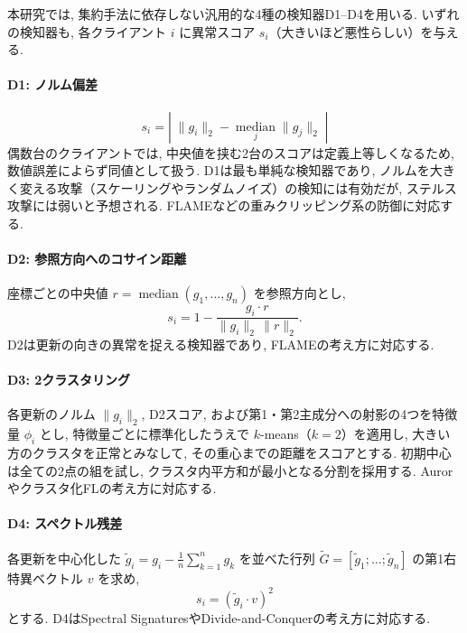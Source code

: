 \documentclass[a4j, twocolumn, dvipdfmx]{jsarticle}
\begin{document}
本研究では, 集約手法に依存しない汎用的な4種の検知器D1--D4を用いる. いずれの検知器も, 各クライアント $i$ に異常スコア $s_i$（大きいほど悪性らしい）を与える.

\paragraph{D1: ノルム偏差}
\begin{equation}
s_i = \left|\; \|g_i\|_2 - \operatorname*{median}_{j}\|g_j\|_2 \;\right|
\end{equation}
偶数台のクライアントでは, 中央値を挟む2台のスコアは定義上等しくなるため, 数値誤差によらず同値として扱う. D1は最も単純な検知器であり, ノルムを大きく変える攻撃（スケーリングやランダムノイズ）の検知には有効だが, ステルス攻撃には弱いと予想される. FLAME\cite{nguyen2022flame}などの重みクリッピング系の防御に対応する.

\paragraph{D2: 参照方向へのコサイン距離}
座標ごとの中央値 $r = \operatorname{median}(g_1,\dots,g_n)$ を参照方向とし,
\begin{equation}
s_i = 1 - \frac{g_i \cdot r}{\|g_i\|_2\,\|r\|_2}.
\end{equation}
D2は更新の向きの異常を捉える検知器であり, FLAME\cite{nguyen2022flame}の考え方に対応する.

\paragraph{D3: 2クラスタリング}
各更新のノルム $\|g_i\|_2$, D2スコア, および第1・第2主成分への射影の4つを特徴量 $\phi_i$ とし, 特徴量ごとに標準化したうえで $k$-means（$k=2$）を適用し, 大きい方のクラスタを正常とみなして, その重心までの距離をスコアとする. 初期中心は全ての2点の組を試し, クラスタ内平方和が最小となる分割を採用する. Auror\cite{shen2016auror}やクラスタ化FL\cite{sattler2020byzantine}の考え方に対応する.

\paragraph{D4: スペクトル残差}
各更新を中心化した $\tilde{g}_i = g_i - \frac{1}{n}\sum_{k=1}^{n} g_k$ を並べた行列 $\tilde{G} = [\tilde{g}_1;\dots;\tilde{g}_n]$ の第1右特異ベクトル $v$ を求め,
\begin{equation}
s_i = (\tilde{g}_i \cdot v)^2
\end{equation}
とする. D4はSpectral Signatures\cite{tran2018spectral}やDivide-and-Conquer\cite{shejwalkar2021manipulating}の考え方に対応する.
\end{document}
